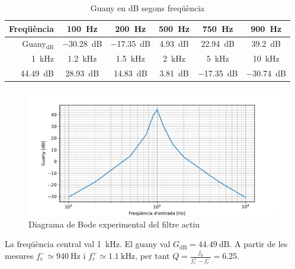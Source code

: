 \documentclass[catalan, a4paper, nobib]{tufte-handout}
\begin{document}
\begin{table}[!h]
    \begin{center}
      \begin{tabular}{@{}rccccc@{}}
        \toprule
        Freqüència & \qty{100}{\hertz} & \qty{200}{\hertz} & \qty{500}{\hertz} & \qty{750}{\hertz} & \qty{900}{\hertz} \\
        \midrule
        Guany$_{\unit{\deci\bel}}$ & \qty{-30.28}{\deci\bel} & \qty{-17.35}{\deci\bel} & \qty{4.93}{\deci\bel} & \qty{22.94}{\deci\bel} & \qty{39.2}{\deci\bel} \\
        \bottomrule
        \toprule
        \qty{1}{\kilo\hertz} & \qty{1.2}{\kilo\hertz} & \qty{1.5}{\kilo\hertz} & \qty{2}{\kilo\hertz} & \qty{5}{\kilo\hertz} & \qty{10}{\kilo\hertz} \\
        \midrule
        \qty{44.49}{\deci\bel} & \qty{28.93}{\deci\bel} & \qty{14.83}{\deci\bel} & \qty{3.81}{\deci\bel} & \qty{-17.35}{\deci\bel} & \qty{-30.74}{\deci\bel} \\
        \bottomrule
      \end{tabular}
    \end{center}
    \caption{Guany en \unit{\deci\bel} segons freqüència}
    \label{tab:bode}
\end{table}

\begin{figure}[!h]
    \begin{center}
        \includegraphics[width=450px]{s2_graph.pdf}
    \end{center}
    \caption{Diagrama de Bode experimental del filtre actiu}
    \label{fig:bode}
\end{figure}

 La freqüència central val \qty{1}{\kilo\hertz}. El guany val $G_{\unit{\deci\bel}}=\qty{44.49}{\deci\bel}$. A partir de les mesures $f_c^-\simeq\qty{940}{\hertz}$ i $f_c^+\simeq\qty{1.1}{\kilo\hertz}$, per tant $Q = \frac{f_0}{f_c^+-f_c^-}=6.25$.
\end{document}
